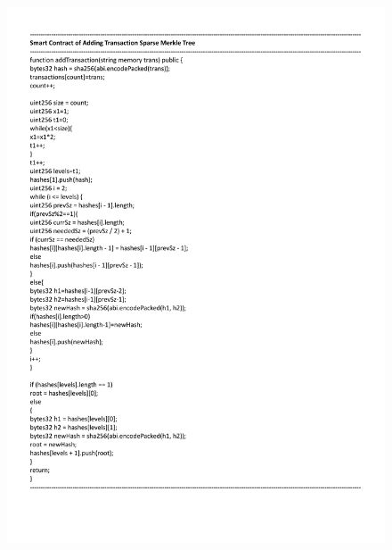 \begin{figure}[H]
    \centering
    \includegraphics[scale=0.65]{figures/insert smt solidity.pdf}
 
\end{figure}


 


